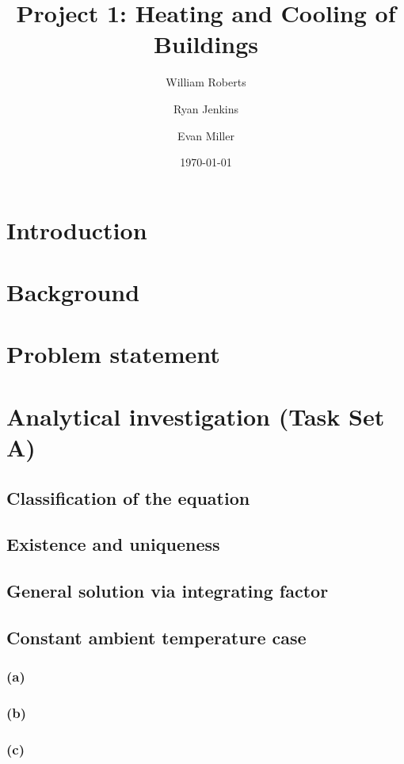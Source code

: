\documentclass[12pt]{article}
\title{Project 1: Heating and Cooling of Buildings}
\author{William Roberts \and Ryan Jenkins \and Evan Miller}
\date{\today}
\begin{document}
\maketitle

\begin{abstract}
\end{abstract}

\tableofcontents
\clearpage

\section{Introduction}

\section{Background}

\section{Problem statement}

\section{Analytical investigation (Task Set A)}
\subsection{Classification of the equation}
\subsection{Existence and uniqueness}
\subsection{General solution via integrating factor}
\subsection{Constant ambient temperature case}
\subsubsection{(a)}
\subsubsection{(b)}
\subsubsection{(c)}
\end{document}

